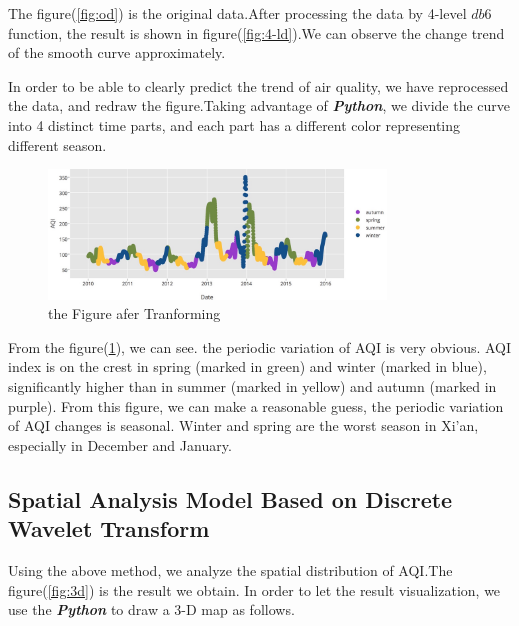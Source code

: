 \documentclass[a4paper,11pt]{article}
\begin{document}
\par The figure(\ref{fig:od}) is the original data.After processing the data by 4-level $db6$ function, the result is shown in figure(\ref{fig:4-ld}).We can observe the change trend of the smooth curve approximately.
\par In order to be able to clearly predict the trend of air quality, we have reprocessed the data, and redraw the figure.Taking advantage of \textbf{\emph{Python}}, we divide the curve into 4 distinct time parts, and each part has a different color representing different season.
\begin{figure}[h]%
\centering %
\includegraphics[width=0.8\textwidth]{./Pic/NO1/Trspart.jpg}
\caption{the Figure afer Tranforming} 
\label{fig:Trspart}  
\end{figure}

\par From the figure(\ref{fig:Trspart}), we can see. the periodic variation of AQI is very obvious. AQI index is on the crest in spring (marked in green) and winter (marked in blue), significantly higher than in summer (marked in yellow) and autumn (marked in purple). From this figure, we can make a reasonable guess,  the periodic variation of AQI changes is seasonal. Winter and spring are the worst season in Xi'an, especially in December and January.


\subsection{Spatial Analysis Model Based on Discrete Wavelet Transform}
\par Using the above method, we analyze the spatial distribution of AQI.The figure(\ref{fig:3d}) is the result we obtain. In order to let the result visualization, we use the \textbf{\emph{Python}} to draw a 3-D map as follows.
\end{document}

